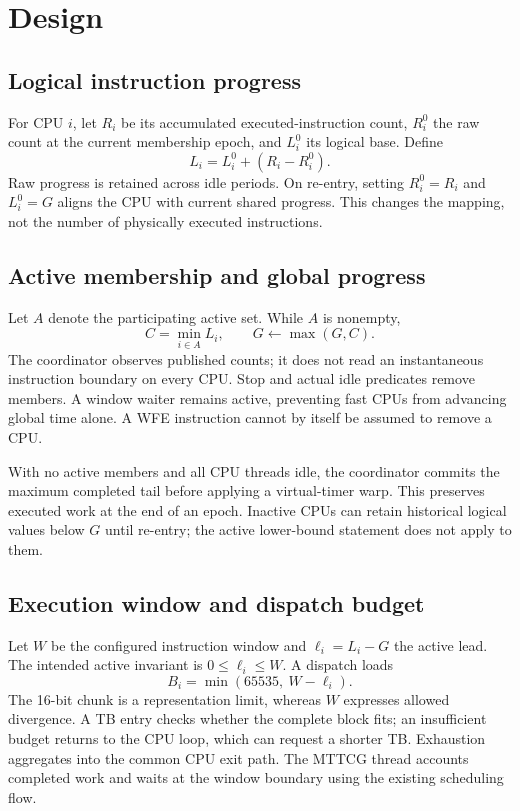 \documentclass[10pt]{article}
\begin{document}
\section{Design}
\subsection{Logical instruction progress}
For CPU $i$, let $R_i$ be its accumulated executed-instruction count,
$R_i^0$ the raw count at the current membership epoch, and $L_i^0$ its logical
base. Define
\[
 L_i=L_i^0+(R_i-R_i^0).
\]
Raw progress is retained across idle periods. On re-entry, setting
$R_i^0=R_i$ and $L_i^0=G$ aligns the CPU with current shared progress.
This changes the mapping, not the number of physically executed instructions.

\subsection{Active membership and global progress}
Let $A$ denote the participating active set. While $A$ is nonempty,
\[
 C=\min_{i\in A}L_i,\qquad G\leftarrow\max(G,C).
\]
The coordinator observes published counts; it does not read an instantaneous
instruction boundary on every CPU. Stop and actual idle predicates remove
members. A window waiter remains active, preventing fast CPUs from advancing
global time alone. A WFE instruction cannot by itself be assumed to remove a CPU.

With no active members and all CPU threads idle, the coordinator commits the
maximum completed tail before applying a virtual-timer warp. This preserves
executed work at the end of an epoch. Inactive CPUs can retain historical logical
values below $G$ until re-entry; the active lower-bound statement does not apply
to them.

\subsection{Execution window and dispatch budget}
Let $W$ be the configured instruction window and $\ell_i=L_i-G$ the active lead.
The intended active invariant is $0\leq\ell_i\leq W$. A dispatch loads
\[
 B_i=\min(65535,\ W-\ell_i).
\]
The 16-bit chunk is a representation limit, whereas $W$ expresses allowed
divergence. A TB entry checks whether the complete block fits; an insufficient
budget returns to the CPU loop, which can request a shorter TB. Exhaustion
aggregates into the common CPU exit path. The MTTCG thread accounts completed
work and waits at the window boundary using the existing scheduling flow.
\end{document}
